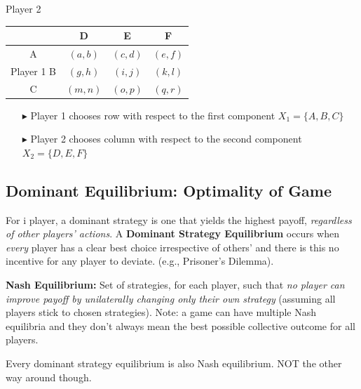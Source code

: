 \documentclass[../Main.tex]{subfiles}
\begin{document}
\begin{center}
    Player 2 \\
    \begin{tabular}{|c|c|c|c|}
        \cline{2-4}
        \multicolumn{1}{c|}{} & D & E & F \\
        \hline
        A & $(a, b)$ & $(c, d)$ & $(e, f)$ \\
        \cline{2-4}
        Player 1 \quad B & $(g, h)$ & $(i, j)$ & $(k, l)$ \\
        \cline{2-4}
        C & $(m, n)$ & $(o, p)$ & $(q, r)$ \\
        \hline
    \end{tabular}
\end{center}

\begin{itemize}
    \item[$\blacktriangleright$] Player 1 chooses row with respect to the first component
    $X_1 = \{A, B, C\}$
    \item[$\blacktriangleright$] Player 2 chooses column with respect to the second
    component $X_2 = \{D, E, F\}$
\end{itemize}

\subsection{Dominant Equilibrium: Optimality of Game}
For i player, a dominant strategy is one that yields the highest payoff, \textit{regardless of other players' actions}. A \textbf{Dominant Strategy Equilibrium} occurs when \textit{every} player has a clear best choice irrespective of others' and there is this no incentive for any player to deviate. (e.g., Prisoner's Dilemma). 

\textbf{Nash Equilibrium:} Set of strategies, for each player, such that \textit{no player can improve payoff by unilaterally changing only their own strategy} (assuming all players stick to chosen strategies). Note: a game can have multiple Nash equilibria and they don't always mean the best possible collective outcome for all players.

Every dominant strategy equilibrium is also Nash equilibrium. NOT the other way around though. 

\end{document}
